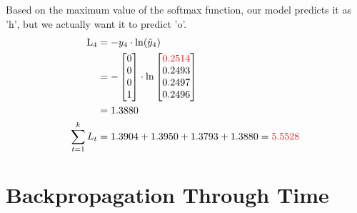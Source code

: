 \documentclass{article}
\begin{document}
Based on the maximum value of the softmax function, our model predicts it as 'h', but we actually want it to predict 'o'.
\begin{align*}
    \text{L}_{4} & = -y_4 \cdot \ln(\hat{y}_4) \\
    &=-\begin{bmatrix} 0 \\ 0 \\ 0 \\ 1 \end{bmatrix} \cdot \ln{\begin{bmatrix}
  \textcolor{red}{0.2514} \\
 0.2493 \\
 0.2497 \\
 0.2496 \\
\end{bmatrix}}\\
    &=1.3880\\
    \sum_{t=1}^k L_t & = 1.3904 + 1.3950 + 1.3793 + 1.3880 = \textcolor{red}{5.5528}
\end{align*}

\section{Backpropagation Through Time}
\end{document}

